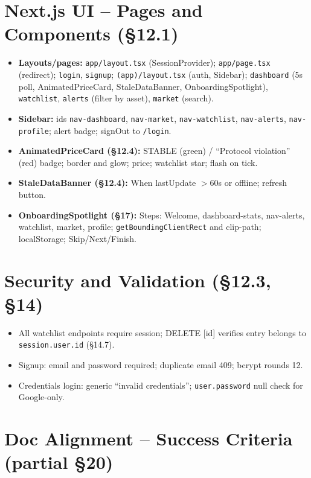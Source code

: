 \documentclass[11pt,a4paper]{report}
\begin{document}
\section{Next.js UI -- Pages and Components (\S12.1)}

\begin{itemize}[leftmargin=*]
  \item \textbf{Layouts/pages:} \texttt{app/layout.tsx} (SessionProvider); \texttt{app/page.tsx} (redirect); \texttt{login}, \texttt{signup}; \texttt{(app)/layout.tsx} (auth, Sidebar); \texttt{dashboard} (5s poll, AnimatedPriceCard, StaleDataBanner, OnboardingSpotlight), \texttt{watchlist}, \texttt{alerts} (filter by asset), \texttt{market} (search).
  \item \textbf{Sidebar:} ids \texttt{nav-dashboard}, \texttt{nav-market}, \texttt{nav-watchlist}, \texttt{nav-alerts}, \texttt{nav-profile}; alert badge; signOut to \texttt{/login}.
  \item \textbf{AnimatedPriceCard (\S12.4):} STABLE (green) / ``Protocol violation'' (red) badge; border and glow; price; watchlist star; flash on tick.
  \item \textbf{StaleDataBanner (\S12.4):} When lastUpdate $>$60s or offline; refresh button.
  \item \textbf{OnboardingSpotlight (\S17):} Steps: Welcome, dashboard-stats, nav-alerts, watchlist, market, profile; \texttt{getBoundingClientRect} and clip-path; localStorage; Skip/Next/Finish.
\end{itemize}

\section{Security and Validation (\S12.3, \S14)}

\begin{itemize}[leftmargin=*]
  \item All watchlist endpoints require session; DELETE [id] verifies entry belongs to \texttt{session.user.id} (\S14.7).
  \item Signup: email and password required; duplicate email 409; bcrypt rounds 12.
  \item Credentials login: generic ``invalid credentials''; \texttt{user.password} null check for Google-only.
\end{itemize}

\section{Doc Alignment -- Success Criteria (partial \S20)}
\end{document}
